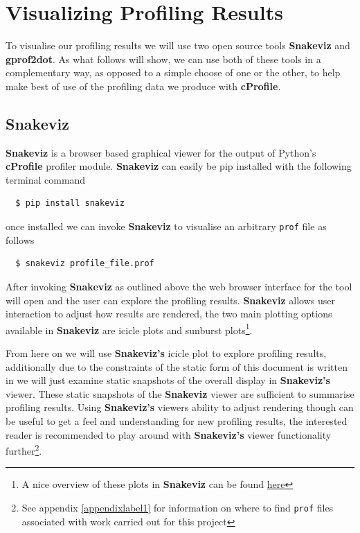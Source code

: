 \section{Visualizing Profiling Results}

To visualise our profiling results we will use two open source tools \textbf{Snakeviz} and \textbf{gprof2dot}. As what follows will show, we can use both of these tools in a complementary way, as opposed to a simple choose of one or the other, to help make best of use of the profiling data we produce with \textbf{cProfile}.

\subsection{Snakeviz}\label{snakeviz}
\textbf{Snakeviz}\cite{snakeviz} is a browser based graphical viewer for the output of Python's \textbf{cProfile} profiler module. \textbf{Snakeviz} can easily be pip installed with the following terminal command

\begin{verbatim}
  $ pip install snakeviz
\end{verbatim}

once installed we can invoke \textbf{Snakeviz} to visualise an arbitrary \texttt{prof} file as follows

\begin{verbatim}
  $ snakeviz profile_file.prof
\end{verbatim}

After invoking \textbf{Snakeviz} as outlined above the web browser interface for the tool will open and the user can explore the profiling results. \textbf{Snakeviz} allows user interaction to adjust how results are rendered, the two main plotting options available in \textbf{Snakeviz} are icicle plots and sunburst plots\footnote{A nice overview of these plots in \textbf{Snakeviz} can be found \href{https://www.machinelearningplus.com/python/cprofile-how-to-profile-your-python-code/}{here}}. 

From here on we will use \textbf{Snakeviz's} icicle plot to explore profiling results, additionally due to the constraints of the static form of this document is written in we will just examine static snapshots of the overall display in \textbf{Snakeviz's} viewer. These static snapshots of the \textbf{Snakeviz} viewer are sufficient to summarise profiling results. Using \textbf{Snakeviz's} viewers ability to adjust rendering though can be useful to get a feel and understanding for new profiling results, the interested reader is recommended to play around with \textbf{Snakeviz's} viewer functionality further\footnote{See appendix \ref{appendixlabel1} for information on where to find \texttt{prof} files associated with work carried out for this project }.

